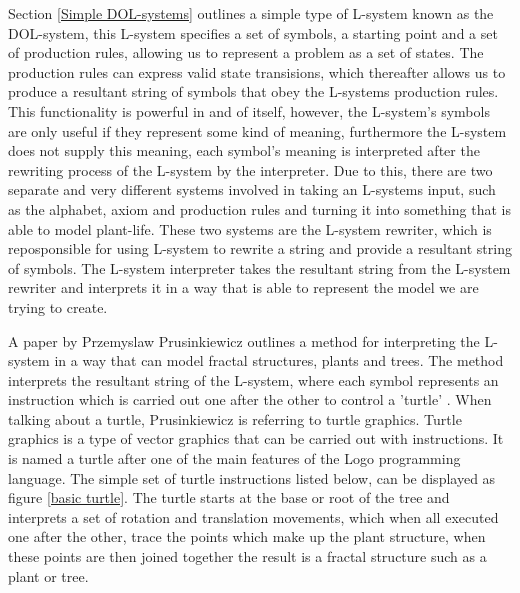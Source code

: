 \begin{flushleft}

Section \ref{Simple DOL-systems} outlines a simple type of L-system known as the DOL-system, this L-system specifies a set of symbols, a starting point and a set of production rules, allowing us to represent a problem as a set of states. The production rules can express valid state transisions, which thereafter allows us to produce a resultant string of symbols that obey the L-systems production rules. This functionality is powerful in and of itself, however, the L-system's symbols are only useful if they represent some kind of meaning, furthermore the L-system does not supply this meaning, each symbol's meaning is interpreted after the rewriting process of the L-system by the interpreter. Due to this, there are two separate and very different systems involved in taking an L-systems input, such as the alphabet, axiom and production rules and turning it into something that is able to model plant-life. These two systems are the L-system rewriter, which is reposponsible for using L-system to rewrite a string and provide a resultant string of symbols. The L-system interpreter takes the resultant string from the L-system rewriter and interprets it in a way that is able to represent the model we are trying to create. \\

\vspace{5mm}

A paper by Przemyslaw Prusinkiewicz outlines a method for interpreting the L-system in a way that can model fractal structures, plants and trees. The method interprets the resultant string of the L-system, where each symbol represents an instruction which is carried out one after the other to control a 'turtle' \cite{prusinkiewicz1986graphical}. When talking about a turtle, Prusinkiewicz is referring to turtle graphics. Turtle graphics is a type of vector graphics that can be carried out with instructions. It is named a turtle after one of the main features of the Logo programming language. The simple set of turtle instructions listed below, can be displayed as figure \ref{basic turtle}. The turtle starts at the base or root of the tree and interprets a set of rotation and translation movements, which when all executed one after the other, trace the points which make up the plant structure, when these points are then joined together the result is a fractal structure such as a plant or tree.\\

\vspace{5mm}


\end{flushleft}
